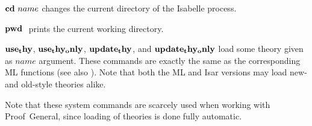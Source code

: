 \begin{descr}
\item [${\mathord{\mathbf{cd}}}~name$] changes the current directory of the Isabelle
  process.
\item [${\mathord{\mathbf{pwd}}}~$] prints the current working directory.
\item [${\mathord{\mathbf{use_thy}}}$, ${\mathord{\mathbf{use_thy_only}}}$,
  ${\mathord{\mathbf{update_thy}}}$, and ${\mathord{\mathbf{update_thy_only}}}$] load some
  theory given as $name$ argument.  These commands are exactly the same as the
  corresponding ML functions (see also \cite[\S1,\S6]{isabelle-ref}).  Note
  that both the ML and Isar versions may load new- and old-style theories
  alike.
\end{descr}

Note that these system commands are scarcely used when working with
Proof~General, since loading of theories is done fully automatic.


